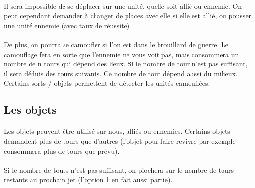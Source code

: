 \paragraph{} Il sera impossible de se déplacer sur une unité, quelle soit allié ou ennemie. On peut cependant demander à changer de places avec elle si elle est allié, ou pousser une unité ennemie (avec taux de réussite) 

\paragraph{} De plus, on pourra se camoufler si l'on est dans le brouillard de guerre. Le camouflage fera en sorte que l'ennemie ne vous voit pas, mais consommera un nombre de n tours qui dépend des lieux. Si le nombre de tour n'est pas suffisant, il sera déduis des tours suivants.
Ce nombre de tour dépend aussi du milieux.
Certains sorts / objets permettent de détecter les unités camouflées.

\subsection{Les objets}
\paragraph{} Les objets peuvent être utilisé sur nous, alliés ou ennemies. Certains objets demandent plus de tours que d'autres (l'objet pour faire revivre par exemple consommera plus de tours que prévu).
\paragraph{} Si le nombre de tours n'est pas suffisant, on piochera sur le nombre de tours restants au prochain jet (l'option 1 en fait aussi partie).
